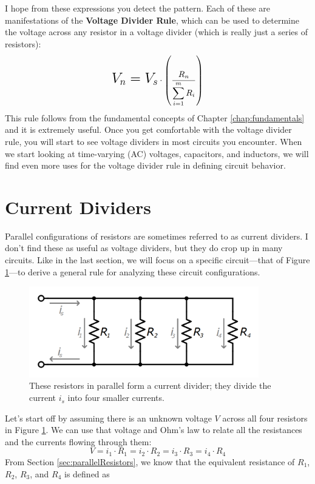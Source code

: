 I hope from these expressions you detect the pattern. Each of these are manifestations of the \textbf{Voltage Divider Rule}, which can be used to determine the voltage across any resistor in a voltage divider (which is really just a series of resistors):
$$
\mathlarger{\mathlarger{\mathlarger{V_n = V_s}}} \cdot \left(\frac{R_n}{\displaystyle\sum_{i=1}^m{R_i}}\right)
$$
This rule follows from the fundamental concepts of Chapter \ref{chap:fundamentals} and it is extremely useful. Once you get comfortable with the voltage divider rule, you will start to see voltage dividers in most circuits you encounter. When we start looking at time-varying (AC) voltages, capacitors, and inductors, we will find even more uses for the voltage divider rule in defining circuit behavior.

\section{Current Dividers}
\label{sec:currentDividers}
Parallel configurations of resistors are sometimes referred to as current dividers. I don't find these as useful as voltage dividers, but they do crop up in many circuits. Like in the last section, we will focus on a specific circuit---that of Figure \ref{currentDivider}---to derive a general rule for analyzing these circuit configurations.
\begin{figure}[h!]
\centering
\includegraphics[width=10cm]{figures/currentDivider.png}
\caption{These resistors in parallel form a current divider; they divide the current $i_s$ into four smaller currents.}
\label{currentDivider}
\end{figure}
\par
Let's start off by assuming there is an unknown voltage $V$ across all four resistors in Figure \ref{currentDivider}. We can use that voltage and Ohm's law to relate all the resistances and the currents flowing through them:
$$
V = i_1 \cdot R_1 = i_2 \cdot R_2 = i_3 \cdot R_3 = i_4 \cdot R_4
$$
From Section \ref{sec:parallelResistors}, we know that the equivalent resistance of $R_1$, $R_2$, $R_3$, and $R_4$ is defined as
